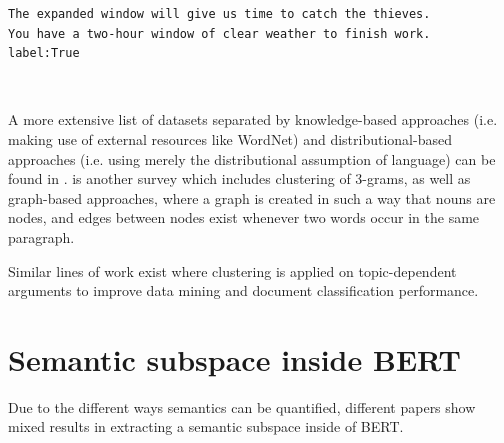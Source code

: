 \documentclass[a4paper,12pt,twoside,openright]{report}
\begin{document}
\quad

\begin{tcolorbox}
\begin{verbatim}
The expanded window will give us time to catch the thieves.
You have a two-hour window of clear weather to finish work.
label:True
\end{verbatim} \\
\end{tcolorbox} 

A more extensive list of datasets separated by knowledge-based approaches (i.e. making use of external resources like WordNet) and distributional-based approaches (i.e. using merely the distributional assumption of language) can be found in \cite{navigli19}.
\cite{denkowski09} is another survey which includes clustering of 3-grams, as well as graph-based approaches, where a graph is created in such a way that nouns are nodes, and edges between nodes exist whenever two words occur in the same paragraph.

Similar lines of work exist where clustering is applied on topic-dependent arguments \cite{reimers19} to improve data mining and document classification performance.

\section{Semantic subspace inside BERT}

Due to the different ways semantics can be quantified, different papers show mixed results in extracting a semantic subspace inside of BERT.
\end{document}
